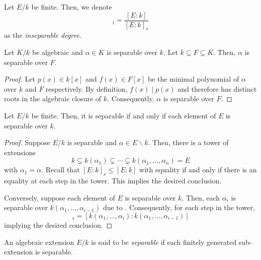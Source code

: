 \begin{definition}
    Let $E/k$ be finite. Then, we denote 
    \begin{equation*}
        [E:k]_i = \frac{[E:k]}{[E:k]_s}
    \end{equation*}
    as the \textit{inseparable degree}.
\end{definition}

\begin{lemma}
    Let $K/k$ be algebraic and $\alpha\in K$ is separable over $k$. Let $k\subseteq F\subseteq K$. Then, $\alpha$ is separable over $F$.
\end{lemma}
\begin{proof}
    Let $p(x)\in k[x]$ and $f(x)\in F[x]$ be the minimal polynomial of $\alpha$ over $k$ and $F$ respectively. By definition, $f(x)\mid p(x)$ and therefore has distinct roots in the algebraic closure of $k$. Consequently, $\alpha$ is separable over $F$.
\end{proof}

\begin{proposition}
    Let $E/k$ be finite. Then, it is separable if and only if each element of $E$ is separable over $k$.
\end{proposition}
\begin{proof}
    Suppose $E/k$ is separable and $\alpha\in E\backslash k$. Then, there is a tower of extensions 
    \begin{equation*}
        k\subsetneq k(\alpha_1)\subsetneq\cdots\subsetneq k(\alpha_1,\ldots,\alpha_n) = E
    \end{equation*}
    with $\alpha_1 = \alpha$. Recall that $[E:k]_s\le [E:k]$ with equality if and only if there is an equality at each step in the tower. This implies the desired conclusion.

    Conversely, suppose each element of $E$ is separable over $k$. Then, each $\alpha_i$ is separable over $k(\alpha_1,\ldots,\alpha_{i - 1})$ due to . Consequently, for each step in the tower, 
    \begin{equation*}
        [k(\alpha_1,\ldots,\alpha_i):k(\alpha_1,\ldots,\alpha_{i - 1})]_s = 
        [k(\alpha_1,\ldots,\alpha_i):k(\alpha_1,\ldots,\alpha_{i - 1})]
    \end{equation*}
    implying the desired conclusion.
\end{proof}

\begin{definition}
    An algebraic extension $E/k$ is said to be \textit{separable} if each finitely generated sub-extension is separable.
\end{definition}

